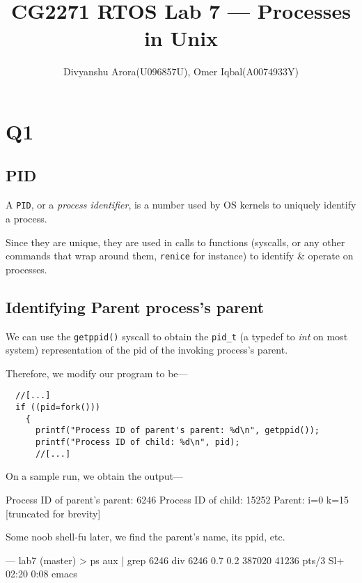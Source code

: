 \documentclass[runningheads,a4paper]{report}
\title{CG2271 RTOS Lab 7 --- Processes in Unix}
\author{Divyanshu Arora(U096857U), Omer Iqbal(A0074933Y)}
\begin{document}
\maketitle
{}
\section*{Q1}

\subsection*{PID}

A \texttt{PID}, or a \textit{process identifier}, is a number used by
OS kernels to uniquely identify a process.

Since they are unique, they are used in calls to functions (syscalls,
or any other commands that wrap around them, \texttt{renice} for
instance) to identify \& operate on processes.

\subsection*{Identifying Parent process's parent}

We can use the \texttt{getppid()} syscall to obtain the
\texttt{pid\_t} (a typedef to \textit{int} on most system)
representation of the pid of the
invoking process's parent.

Therefore, we modify our program to be---
\lstset{caption=Adding a getppid() call, language=inform}
\begin{lstlisting}
  //[...]
  if ((pid=fork()))
    {
      printf("Process ID of parent's parent: %d\n", getppid());
      printf("Process ID of child: %d\n", pid);
      //[...]
\end{lstlisting}


On a sample run, we obtain the output---
\begin{codeoutput}
Process ID of parent's parent: 6246
Process ID of child: 15252
Parent: i=0 k=15
[truncated for brevity]
\end{codeoutput}

Some noob shell-fu later, we find the parent's name, its ppid, etc. 
\lstset{caption=Exhibit `A'}
\begin{code}
--- lab7 (master) > ps aux | grep 6246
div    6246  0.7  0.2 387020 41236 pts/3    Sl+  02:20   0:08 emacs
\end{code}
\end{document}
